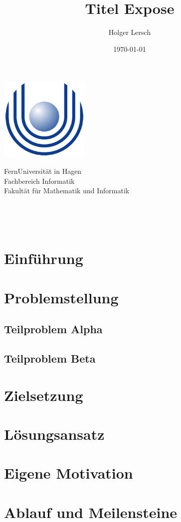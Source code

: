 \documentclass[a4paper,oneside,11pt]{article}
\title{Titel Expose}
\author{Holger Lersch}
\date{\today}
\begin{document}
\begin{titlingpage} %
\begin{center}
\includegraphics[height=4cm]{images/Uni_hagen_logo}\\ %
\begin{large}
FernUniversit\"at in Hagen \\ %
Fachbereich Informatik\\
Fakult\"at f\"ur Mathematik und Informatik\\
\end{large}
\vspace{4cm} %
\begin{large} 
\textbf{\thetitle} \\
\end{large}
\theauthor\\
\vspace{7cm} %
\thedate
\end{center}
\end{titlingpage}

\section{Einf\"uhrung}

\section{Problemstellung}
\subsection{Teilproblem Alpha}
\subsection{Teilproblem Beta}

\section{Zielsetzung}

\section{L\"osungsansatz}

\section{Eigene Motivation}

\section{Ablauf und Meilensteine}
\end{document}
